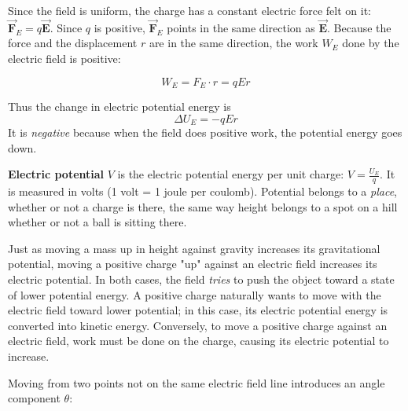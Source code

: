 \begin{Answer}[ref={eq:electric_potential_energy}]

Since the field is uniform, the charge has a constant electric force felt on it: $\vec{\mathbf{F}}_E=q \vec{\mathbf{E}}$. Since $q$ is positive, $\vec{\mathbf{F}}_E$ points in the same direction as $\vec{\mathbf{E}}$. Because the force and the displacement $r$ are in the same direction, the work $W_E$ done by the electric field is positive:

$$W_E = F_E \cdot r = qEr$$

Thus the change in electric potential energy is
$$\Delta U_E = -qEr$$
It is \emph{negative} because when the field does positive work, the
potential energy goes down.
\end{Answer}

\textbf{Electric potential} $V$ is the
electric potential energy per unit charge: $V = \frac{U_E}{q}$. It is
measured in volts (1 volt = 1 joule per coulomb). Potential belongs to a
\emph{place}, whether or not a charge is there, the same way height
belongs to a spot on a hill whether or not a ball is sitting there.

Just as moving a mass up in height against gravity increases its gravitational potential, moving a positive charge "up" against an electric field increases its electric potential. In both cases, the field \textit{tries} to push the object toward a state of lower potential energy. A positive charge naturally wants to move with the electric field toward lower potential; in this case, its electric potential energy is converted into kinetic energy. Conversely, to move a positive charge against an electric field, work must be done on the charge, causing its electric potential to increase.

Moving from two points not on the same electric field line introduces an angle component $\theta$:

